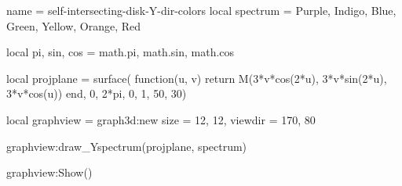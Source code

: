 \documentclass{standalone}
\begin{document}
\begin{luadraw}{name = self-intersecting-disk-Y-dir-colors}
local spectrum = {Purple, Indigo, Blue, Green, Yellow, Orange, Red}

local pi, sin, cos = math.pi, math.sin, math.cos

local projplane = surface(
  function(u, v)
    return M(3*v*cos(2*u), 3*v*sin(2*u), 3*v*cos(u))
  end,
  0, 2*pi, 0, 1,
  {50, 30})

local graphview = graph3d:new{
  size    = {12, 12},
  viewdir = {170, 80}
}

graphview:draw_Yspectrum(projplane, spectrum)

graphview:Show()
\end{luadraw}
\end{document}
